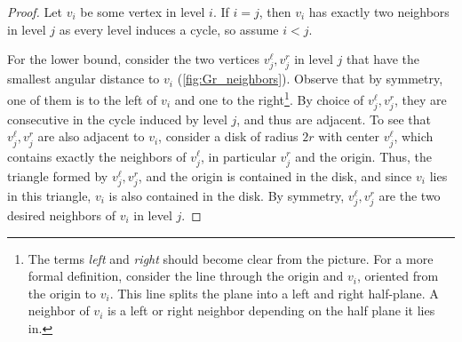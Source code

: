 \documentclass[a4paper,english,cleveref,thm-restate]{lipics-v2021}
\begin{document}
\begin{proof}
    Let $ v_i $ be some vertex in level $ i $.
    If $ i = j $, then $ v_i $ has exactly two neighbors in level $ j $ as every level induces a cycle, so assume $ i < j $.
    
    For the lower bound, consider the two vertices $ v^\ell_j, v^r_j $ in level $ j $ that have the smallest angular distance to $ v_i $ (\cref{fig:Gr_neighbors}).
    Observe that by symmetry, one of them is to the left of $ v_i $ and one to the right\footnote{The terms \emph{left} and \emph{right} should become clear from the picture.
      For a more formal definition, consider the line through the origin and $v_i$, oriented from the origin to $v_i$.
      This line splits the plane into a left and right half-plane.
      A neighbor of $v_i$ is a left or right neighbor depending on the half plane it lies in.}.
    By choice of $ v^\ell_j, v^r_j$, they are consecutive in the cycle induced by level $ j $, and thus are adjacent.
    To see that $ v^\ell_j, v^r_j$ are also adjacent to $ v _i $, consider a disk of radius $ 2r $ with center $ v^\ell_j $, which contains exactly the neighbors of $ v^\ell_j $, in particular $ v^r_j $ and the origin.
    Thus, the triangle formed by $ v^\ell_j, v^r_j $, and the origin is contained in the disk, and since $ v_i $ lies in this triangle, $ v_i $ is also contained in the disk.
    By symmetry, $ v^\ell_j, v^r_j $ are the two desired neighbors of $ v_i $ in level $ j $.


\end{proof}
\end{document}
